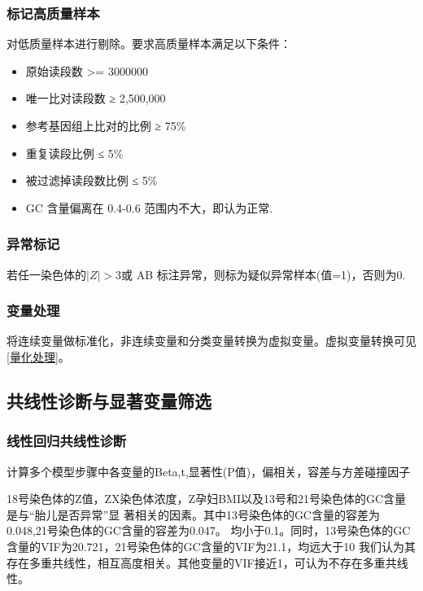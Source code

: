 \documentclass[withoutpreface,notoc]{cumcmthesis}
\begin{document}
	\subsubsection{标记高质量样本}

	对低质量样本进行剔除。要求高质量样本满足以下条件：
	\begin{itemize}
		\item 原始读段数 >= 3000000
		\item 唯一比对读段数 ≥ 2,500,000
		\item 参考基因组上比对的比例 ≥ 75\%
		\item 重复读段比例 ≤ 5\%
		\item 被过滤掉读段数比例 ≤ 5\%
		\item GC 含量偏离在 0.4-0.6 范围内不大，即认为正常.
	\end{itemize}

	\subsubsection{异常标记}

	若任一染色体的$|Z|>3$或 AB 标注异常，则标为疑似异常样本(值=1)，否则为0.


	\subsubsection{变量处理}

	将连续变量做标准化，非连续变量和分类变量转换为虚拟变量。虚拟变量转换可见\cref{量化处理}。

	

	\subsection{共线性诊断与显著变量筛选}

	\subsubsection{线性回归共线性诊断}
	计算多个模型步骤中各变量的Beta,t,显著性(P值)，偏相关，容差与方差碰撞因子











	18号染色体的Z值，ZX染色体浓度，Z孕妇BMI以及13号和21号染色体的GC含量是与“胎儿是否异常”显
	著相关的因素。其中13号染色体的GC含量的容差为0.048,21号染色体的GC含量的容差为0.047。
	均小于0.1。同时，13号染色体的GC含量的VIF为20.721，21号染色体的GC含量的VIF为21.1，均远大于10
	我们认为其存在多重共线性，相互高度相关。其他变量的VIF接近1，可认为不存在多重共线性。
\end{document}
